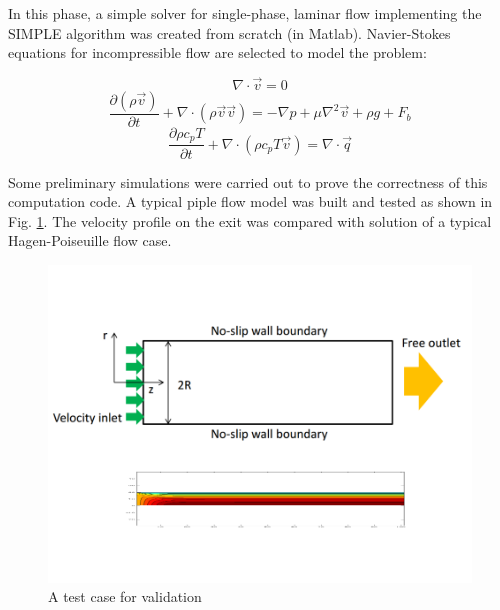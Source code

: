 \documentclass[a4,14pt]{extarticle}
\begin{document}
In this phase, a simple solver for single-phase, laminar flow implementing the
SIMPLE algorithm was created from scratch (in Matlab). Navier-Stokes equations for incompressible
flow are selected to model the problem:

\begin{equation}
  \nabla \cdot \vec v = 0
\end{equation}
\begin{equation}
  \frac{\partial (\rho \vec v)}{\partial t} + \nabla \cdot (\rho \vec v \vec v) = - \nabla p +
  \mu \nabla^2 \vec v+ \rho g + F_b
\end{equation}
\begin{equation}
  \frac{\partial \rho c_p T}{\partial t} + \nabla \cdot (\rho c_p T \vec v) = \nabla \cdot \vec q
\end{equation}


Some preliminary simulations were carried out to prove the correctness of this computation code.
A typical piple flow model was built and tested as shown in Fig. \ref{fig:h-g_model}.
The velocity profile on the exit was compared with solution of a typical Hagen-Poiseuille flow case.

\begin{figure}[h!]
  \centering
  \includegraphics[width=13cm]{h-g_flow_model.png}
  \caption{A test case for validation}
  \label{fig:h-g_model}
\end{figure}
\end{document}
